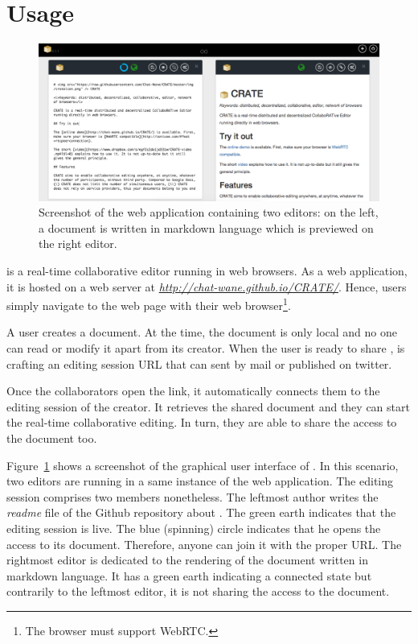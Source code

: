 
\section{Usage}
\label{sec:usage}

\begin{figure}
  \includegraphics[width=\textwidth]{./img/screenshot.png}
  \caption{\label{img:screenshot} Screenshot of the web application containing
    two editors: on the left, a document is written in markdown language which
    is previewed on the right editor.}
\end{figure}

\CRATE is a real-time collaborative editor running in web browsers. As a web
application, it is hosted on a web server at
\emph{\url{http://chat-wane.github.io/CRATE/}}. Hence, users simply navigate to
the web page with their web browser\footnote{The browser must support WebRTC.}.

A user creates a document. At the time, the document is only local and
no one can read or modify it apart from its creator. When the user is
ready to share , \CRATE is crafting an editing session URL that can
sent by mail or published on twitter. 

Once the collaborators open the link, it automatically connects them
to the editing session of the creator. It retrieves the shared
document and they can start the real-time collaborative editing. In
turn, they are able to share the access to the document too. 

Figure~\ref{img:screenshot} shows a screenshot of the graphical user interface
of \CRATE. In this scenario, two editors are running in a same instance of the
web application. The editing session comprises two members nonetheless. The
leftmost author writes the \emph{readme} file of the Github repository about
\CRATE. The green earth indicates that the editing session is live. The blue
(spinning) circle indicates that he opens the access to its document. Therefore,
anyone can join it with the proper URL. The rightmost editor is dedicated to the
rendering of the document written in markdown language. It has a green earth
indicating a connected state but contrarily to the leftmost editor, it is not
sharing the access to the document.

